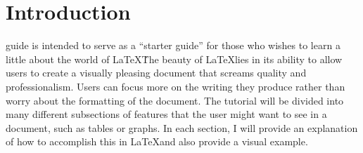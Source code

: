 \documentclass[12pt,journal,compsoc]{IEEEtran}
\begin{document}
\section{Introduction}
%
%



% 
% 
% 
% 

  guide is intended to serve as a ``starter guide''
for those who wishes to learn a little about the world of \LaTeX\. The beauty of \LaTeX lies in its ability to allow users to create a visually pleasing document that screams quality and professionalism. Users can focus more on the writing they produce rather than worry about the formatting of the document. 
The tutorial will be divided into many different subsections of features that the user might want to see in a document, such as tables or graphs.  In each section, I will provide an explanation of how to accomplish this in \LaTeX and also provide a visual example. 
\end{document}
